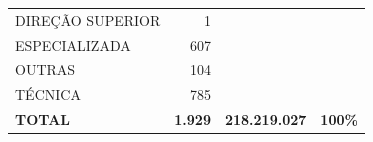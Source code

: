 \documentclass{article}
\begin{document}
\begin{longtable}[c]{m{7cm}|m{2.5cm}|m{2.5cm}|m{2.5cm}}
\multicolumn{1}{L{7cm}|}{ \hspace{3em} DIREÇÃO SUPERIOR} & \multicolumn{1}{r|}{ 1} &  & \\
\multicolumn{1}{L{7cm}|}{ \hspace{3em} ESPECIALIZADA} & \multicolumn{1}{r|}{ 607} &  & \\
\multicolumn{1}{L{7cm}|}{ \hspace{3em} OUTRAS} & \multicolumn{1}{r|}{ 104} &  & \\
\multicolumn{1}{L{7cm}|}{ \hspace{3em} TÉCNICA} & \multicolumn{1}{r|}{ 785} &  & \\
\hline \hline 
\multicolumn{1}{L{7cm}|}{ \textbf{TOTAL}} & \multicolumn{1}{r|}{ \textbf{1.929}} & \multicolumn{1}{r|}{ \textbf{218.219.027}} & \multicolumn{1}{r}{ \textbf{100\%}} \\
\end{longtable}
\newpage
\small
\end{document}
